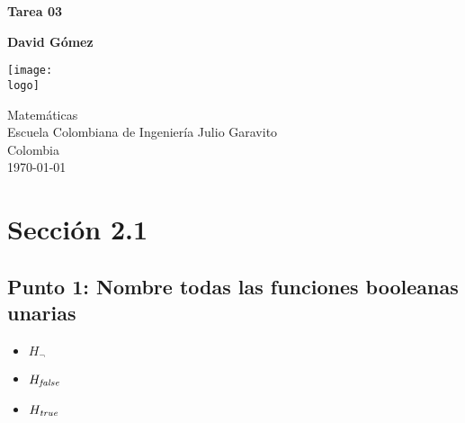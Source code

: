 \documentclass{article}
\newcommand{\logo}{C:/Users/usuario/Documents/U/logo-eci.jpg}
\begin{document}
\begin{titlepage}
	\begin{center}
		\vspace*{1cm}

		\textbf{\Huge{Tarea 03}}

		\vspace{1.5cm}

		\textbf{\large{David Gómez}}

		\vspace{4cm}

		\texttt{[image: \\logo]}

		\vspace{5cm}

		Matemáticas\\
		Escuela Colombiana de Ingeniería Julio Garavito\\
		Colombia\\
		\today

	\end{center}
\end{titlepage}
\clearpage
\tableofcontents
\clearpage
\section{Sección 2.1}
\subsection{Punto 1: Nombre todas las funciones booleanas unarias}
\begin{itemize}
	\item $H_{\lnot}$
	\item $H_{\textrm{\textit{false}}}$
	\item $H_{\textrm{\textit{true}}}$
\end{itemize}
\end{document}

